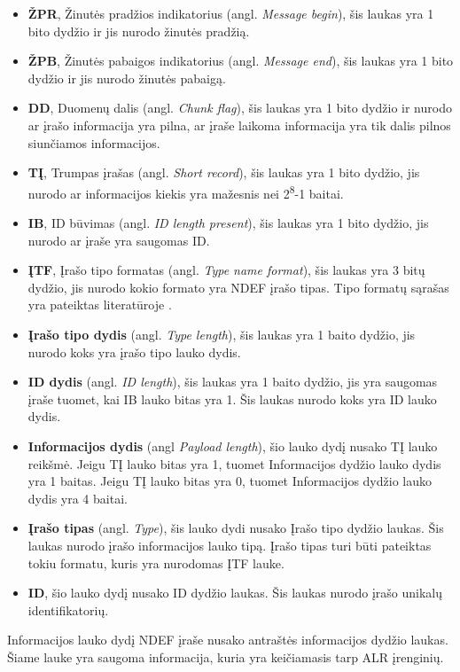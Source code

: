 \begin{itemize}
    \item \textbf{ŽPR}, Žinutės pradžios indikatorius (angl. \textit{Message begin}), šis laukas yra 1 bito dydžio ir jis nurodo žinutės pradžią.
    \item \textbf{ŽPB}, Žinutės pabaigos indikatorius (angl. \textit{Message end}), šis laukas yra 1 bito dydžio ir jis nurodo žinutės pabaigą.
    \item \textbf{DD}, Duomenų dalis (angl. \textit{Chunk flag}), šis laukas yra 1 bito dydžio ir nurodo ar įrašo informacija yra pilna, ar įraše laikoma informacija yra tik dalis pilnos siunčiamos informacijos.
    \item \textbf{TĮ}, Trumpas įrašas (angl. \textit{Short record}), šis laukas yra 1 bito dydžio, jis nurodo ar informacijos kiekis yra mažesnis nei 2\textsuperscript{8}-1 baitai.
    \item \textbf{IB}, ID būvimas (angl. \textit{ID length present}), šis laukas yra 1 bito dydžio, jis nurodo ar įraše yra saugomas ID.
    \item \textbf{ĮTF}, Įrašo tipo formatas (angl. \textit{Type name format}), šis laukas yra 3 bitų dydžio, jis nurodo kokio formato yra NDEF įrašo tipas. Tipo formatų sąrašas yra pateiktas literatūroje \cite{Leora1980}.
    \item \textbf{Įrašo tipo dydis} (angl. \textit{Type length}), šis laukas yra 1 baito dydžio, jis nurodo koks yra įrašo tipo lauko dydis.
    \item \textbf{ID dydis} (angl. \textit{ID length}), šis laukas yra 1 baito dydžio, jis yra saugomas įraše tuomet, kai IB lauko bitas yra 1. Šis laukas nurodo koks yra ID lauko dydis.
    \item \textbf{Informacijos dydis} (angl \textit{Payload length}), šio lauko dydį nusako TĮ lauko reikšmė. Jeigu TĮ lauko bitas yra 1, tuomet Informacijos dydžio lauko dydis yra 1 baitas. Jeigu TĮ lauko bitas yra 0, tuomet Informacijos dydžio lauko dydis yra 4 baitai.
    \item \textbf{Įrašo tipas} (angl. \textit{Type}), šis lauko dydi nusako Įrašo tipo dydžio laukas. Šis laukas nurodo įrašo informacijos lauko tipą. Įrašo tipas turi būti pateiktas tokiu formatu, kuris yra nurodomas ĮTF lauke.
    \item \textbf{ID}, šio lauko dydį nusako ID dydžio laukas. Šis laukas nurodo įrašo unikalų identifikatorių.
\end{itemize}
Informacijos lauko dydį NDEF įraše nusako antraštės informacijos dydžio laukas. Šiame lauke yra saugoma informacija, kuria yra keičiamasis tarp ALR įrenginių.

